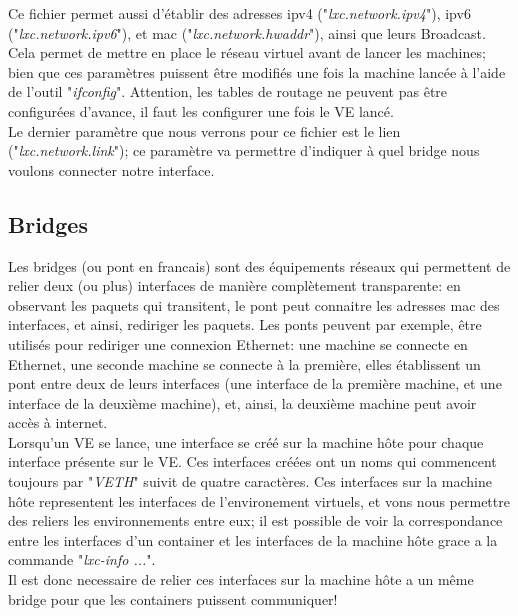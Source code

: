 \documentclass{article}
\begin{document}
Ce fichier permet aussi d'\'etablir des adresses ipv4 ("\emph{lxc.network.ipv4}"), ipv6 ("\emph{lxc.network.ipv6}"),
et mac ("\emph{lxc.network.hwaddr}"), ainsi que leurs Broadcast. Cela permet de mettre en place le r\'eseau 
virtuel avant de lancer les machines; bien que ces param\`etres puissent \^etre modifi\'es une fois la machine
lanc\'ee \`a l'aide de l'outil "\emph{ifconfig}". Attention, les tables de routage ne peuvent pas \^etre configur\'ees d'avance, il faut les configurer une fois le VE lanc\'e.\\

Le dernier param\`etre que nous verrons pour ce fichier est le lien ("\emph{lxc.network.link}"); ce param\`etre
va permettre d'indiquer \`a quel bridge nous voulons connecter notre interface.\\


\subsection{Bridges}
Les bridges (ou pont en francais) sont des \'equipements r\'eseaux qui permettent de relier deux (ou plus)
interfaces de mani\`ere compl\`etement transparente: en observant les paquets qui transitent, le pont peut 
connaitre les adresses mac des interfaces, et ainsi, rediriger les paquets. Les ponts peuvent par exemple,
\^etre utilis\'es pour rediriger une connexion Ethernet: une machine se connecte en Ethernet, une seconde 
machine se connecte \`a la premi\`ere, elles \'etablissent un pont entre deux de leurs interfaces (une interface
de la premi\`ere machine, et une interface de la deuxi\`eme machine), et, ainsi, la deuxi\`eme machine peut 
avoir acc\`es \`a internet.\\

Lorsqu'un VE se lance, une interface se cr\'e\'e sur la machine h\^ote pour chaque interface pr\'esente sur le VE. Ces interfaces cr\'e\'ees ont un noms qui commencent toujours par "\emph{VETH}" suivit de quatre caract\`eres. Ces interfaces sur la machine h\^ote representent les interfaces de l'environement virtuels, et vons nous permettre des reliers les environnements entre eux; il est possible de voir la correspondance entre les interfaces d'un container et les interfaces de la machine h\^ote grace a la commande "\emph{lxc-info ...}".\\

Il est donc necessaire de relier ces interfaces sur la machine h\^ote a un m\^eme bridge pour que les containers puissent communiquer!
\end{document}

